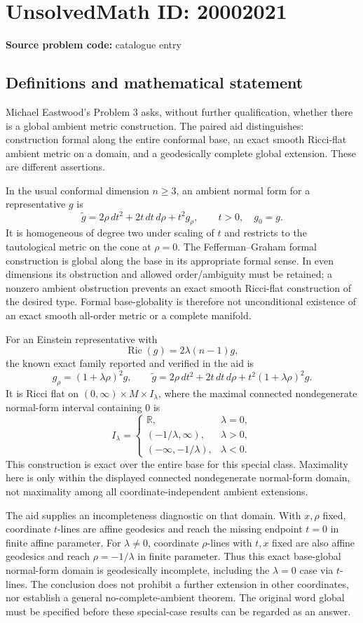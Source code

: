 \documentclass[11pt]{article}
\begin{document}
\section*{UnsolvedMath ID: 20002021}
\textbf{Source problem code:} catalogue entry
\subsection{Definitions and mathematical statement}
Michael Eastwood's Problem 3 asks, without further qualification, whether there is a global ambient metric construction. The paired aid distinguishes: construction formal along the entire conformal base, an exact smooth Ricci-flat ambient metric on a domain, and a geodesically complete global extension. These are different assertions.

In the usual conformal dimension \(n\geq3\), an ambient normal form for a representative \(g\) is
\[
 \widetilde g=2\rho\,dt^2+2t\,dt\,d\rho+t^2g_\rho,
 \qquad t>0,\quad g_0=g.
\]
It is homogeneous of degree two under scaling of \(t\) and restricts to the tautological metric on the cone at \(\rho=0\). The Fefferman--Graham formal construction is global along the base in its appropriate formal sense. In even dimensions its obstruction and allowed order/ambiguity must be retained; a nonzero ambient obstruction prevents an exact smooth Ricci-flat construction of the desired type. Formal base-globality is therefore not unconditional existence of an exact smooth all-order metric or a complete manifold.

For an Einstein representative with
\[
 \operatorname{Ric}(g)=2\lambda(n-1)g,
\]
the known exact family reported and verified in the aid is
\[
 g_\rho=(1+\lambda\rho)^2g,\qquad
 \widetilde g=2\rho\,dt^2+2t\,dt\,d\rho
                  +t^2(1+\lambda\rho)^2g.
\]
It is Ricci flat on \((0,\infty)\times M\times I_\lambda\), where the maximal connected nondegenerate normal-form interval containing \(0\) is
\[
 I_\lambda=\begin{cases}
 \mathbb R,&\lambda=0,\\
 (-1/\lambda,\infty),&\lambda>0,\\
 (-\infty,-1/\lambda),&\lambda<0.
 \end{cases}
\]
This construction is exact over the entire base for this special class. Maximality here is only within the displayed connected nondegenerate normal-form domain, not maximality among all coordinate-independent ambient extensions.

The aid supplies an incompleteness diagnostic on that domain. With \(x,\rho\) fixed, coordinate \(t\)-lines are affine geodesics and reach the missing endpoint \(t=0\) in finite affine parameter. For \(\lambda\ne0\), coordinate \(\rho\)-lines with \(t,x\) fixed are also affine geodesics and reach \(\rho=-1/\lambda\) in finite parameter. Thus this exact base-global normal-form domain is geodesically incomplete, including the \(\lambda=0\) case via \(t\)-lines. The conclusion does not prohibit a further extension in other coordinates, nor establish a general no-complete-ambient theorem. The original word global must be specified before these special-case results can be regarded as an answer.
\end{document}
